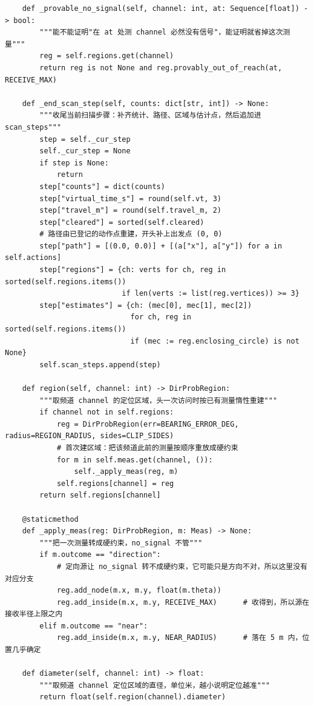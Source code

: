 \documentclass[UTF8, zihao=5,AutoFakeBold=2]{ctexart}
\begin{document}
\begin{lstlisting}
    def _provable_no_signal(self, channel: int, at: Sequence[float]) -> bool:
        """能不能证明"在 at 处测 channel 必然没有信号"，能证明就省掉这次测量"""
        reg = self.regions.get(channel)
        return reg is not None and reg.provably_out_of_reach(at, RECEIVE_MAX)

    def _end_scan_step(self, counts: dict[str, int]) -> None:
        """收尾当前扫描步骤：补齐统计、路径、区域与估计点，然后追加进 scan_steps"""
        step = self._cur_step
        self._cur_step = None
        if step is None:
            return
        step["counts"] = dict(counts)
        step["virtual_time_s"] = round(self.vt, 3)
        step["travel_m"] = round(self.travel_m, 2)
        step["cleared"] = sorted(self.cleared)
        # 路径由已登记的动作点重建，开头补上出发点 (0, 0)
        step["path"] = [(0.0, 0.0)] + [(a["x"], a["y"]) for a in self.actions]
        step["regions"] = {ch: verts for ch, reg in sorted(self.regions.items())
                           if len(verts := list(reg.vertices)) >= 3}
        step["estimates"] = {ch: (mec[0], mec[1], mec[2])
                             for ch, reg in sorted(self.regions.items())
                             if (mec := reg.enclosing_circle) is not None}
        self.scan_steps.append(step)

    def region(self, channel: int) -> DirProbRegion:
        """取频道 channel 的定位区域，头一次访问时按已有测量惰性重建"""
        if channel not in self.regions:
            reg = DirProbRegion(err=BEARING_ERROR_DEG, radius=REGION_RADIUS, sides=CLIP_SIDES)
            # 首次建区域：把该频道此前的测量按顺序重放成硬约束
            for m in self.meas.get(channel, ()):
                self._apply_meas(reg, m)
            self.regions[channel] = reg
        return self.regions[channel]

    @staticmethod
    def _apply_meas(reg: DirProbRegion, m: Meas) -> None:
        """把一次测量转成硬约束，no_signal 不管"""
        if m.outcome == "direction":
            # 定向源让 no_signal 转不成硬约束，它可能只是方向不对，所以这里没有对应分支
            reg.add_node(m.x, m.y, float(m.theta))
            reg.add_inside(m.x, m.y, RECEIVE_MAX)      # 收得到，所以源在接收半径上限之内
        elif m.outcome == "near":
            reg.add_inside(m.x, m.y, NEAR_RADIUS)      # 落在 5 m 内，位置几乎确定

    def diameter(self, channel: int) -> float:
        """取频道 channel 定位区域的直径，单位米，越小说明定位越准"""
        return float(self.region(channel).diameter)


\end{lstlisting}
\end{document}
